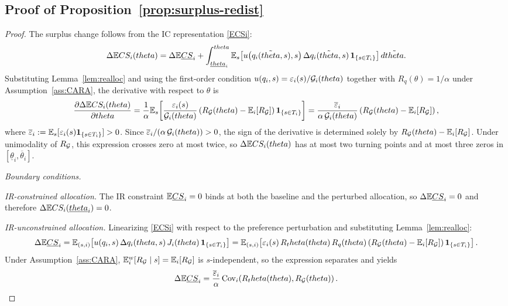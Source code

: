 \documentclass[master.tex]{subfiles}
\begin{document}
\subsection{Proof of Proposition~\ref{prop:surplus-redist}}\begin{proof}
The surplus change follows from the IC representation \eqref{ECSi}:
\[\Delta \mathbb{E} CS_i(theta) = \Delta\mathbb{E}\underline{CS}_i + \int_{\underline{theta}_i}^{theta}\mathbb{E}_s\!\left[u\!\left(q_i(\tilde{theta},s),s\right)\Delta q_i(\tilde{theta},s)\,\mathbf{1}_{\{s\in T_i\}}\right]d\tilde{theta}.\]
Substituting Lemma~\ref{lem:realloc} and using the first-order condition $u(q_i,s)=\varepsilon_i(s)/\mathcal{G}_i(theta)$ together with $R_q(\theta)=1/\alpha$ under Assumption~\ref{ass:CARA}, the derivative with respect to $\theta$ is
\[\frac{\partial\Delta \mathbb{E} CS_i(theta)}{\partial theta} = \frac{1}{\alpha}\mathbb{E}_s\!\left[\frac{\varepsilon_i(s)}{\mathcal{G}_i(theta)}\left(R_{\mathcal{G}}(theta)-\mathbb{E}_i[R_{\mathcal{G}}]\right)\mathbf{1}_{\{s\in T_i\}}\right] = \frac{\overline\varepsilon_i}{\alpha\,\mathcal{G}_i(theta)}\left(R_{\mathcal{G}}(theta)-\mathbb{E}_i[R_{\mathcal{G}}]\right),\]
where $\overline\varepsilon_i:=\mathbb{E}_s[\varepsilon_i(s)\mathbf{1}_{\{s\in T_i\}}]>0$. Since $\overline\varepsilon_i/(\alpha\,\mathcal{G}_i(theta))>0$, the sign of the derivative is determined solely by $R_{\mathcal{G}}(theta)-\mathbb{E}_i[R_{\mathcal{G}}]$. Under unimodality of $R_{\mathcal{G}}$, this expression crosses zero at most twice, so $\Delta \mathbb{E} CS_i(theta)$ has at most two turning points and at most three zeros in $[\underline\theta_i,\overline\theta_i]$.

\noindent\textit{Boundary conditions.}

\noindent\textit{IR-constrained allocation.} The IR constraint $\mathbb{E}\underline{CS}_i=0$ binds at both the baseline and the perturbed allocation, so $\Delta\mathbb{E}\underline{CS}_i=0$ and therefore $\Delta \mathbb{E} CS_i(\underline{theta}_i)=0$.

\noindent\textit{IR-unconstrained allocation.} Linearizing \eqref{ECSi} with respect to the preference perturbation and substituting Lemma~\ref{lem:realloc}:
\[\Delta\mathbb{E}\underline{CS}_i = \mathbb{E}_{(s,i)}\!\left[u\!\left(q_i,s\right)\Delta q_i(theta,s)\,J_i(theta)\,\mathbf{1}_{\{s\in T_i\}}\right] = \mathbb{E}_{(s,i)}\!\left[\varepsilon_i(s)\,R_theta(theta)\,R_q(theta)\left(R_{\mathcal{G}}(theta)-\mathbb{E}_i[R_{\mathcal{G}}]\right)\mathbf{1}_{\{s\in T_i\}}\right].\]
Under Assumption~\ref{ass:CARA}, $\mathbb{E}_i^w[R_{\mathcal{G}}\mid s]=\mathbb{E}_i[R_{\mathcal{G}}]$ is $s$-independent, so the expression separates and yields
\[\Delta\mathbb{E}\underline{CS}_i = \frac{\overline\varepsilon_i}{\alpha}\,\mathrm{Cov}_{i}\!\left(R_theta(theta),R_{\mathcal{G}}(theta)\right).\]





\end{proof}
\end{document}
